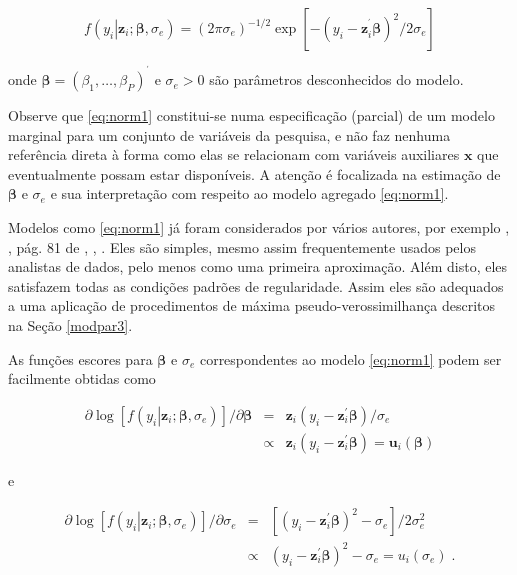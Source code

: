\documentclass[]{book}
\numberwithin{example}{chapter}
\numberwithin{remark}{chapter}
\numberwithin{definition}{chapter}
\begin{document}
\begin{equation}
f\left( \left. y_{i}\right|\mathbf{z}_{i};\mathbf{\beta },\sigma_{e}\right) =\left( 2\pi \sigma _{e}\right) ^{-1/2}\exp \left[ -\left( y_{i}-\mathbf{z}_{i}^{^{\prime }}\mathbf{\beta }\right) ^{2}/2\sigma _{e}\right]
\label{eq:norm1}
\end{equation}

onde
\(\mathbf{\beta }=\left( \beta _{1},\ldots ,\beta _{P}\right) ^{^{\prime }}\)
e \(\sigma_{e}>0\) são parâmetros desconhecidos do modelo.

Observe que \eqref{eq:norm1} constitui-se numa especificação (parcial) de
um modelo marginal para um conjunto de variáveis da pesquisa, e não faz
nenhuma referência direta à forma como elas se relacionam com variáveis
auxiliares \(\mathbf{x}\) que eventualmente possam estar disponíveis. A
atenção é focalizada na estimação de \(\mathbf{\beta }\) e
\(\sigma_{e}\) e sua interpretação com respeito ao modelo agregado
\eqref{eq:norm1}.

Modelos como \eqref{eq:norm1} já foram considerados por vários autores,
por exemplo \citep{holt80b}, \citep{NH80}, pág. 81 de \citep{Sk89b} ,
\citep{chambers86}, \citep{chambers95}. Eles são simples, mesmo assim
frequentemente usados pelos analistas de dados, pelo menos como uma
primeira aproximação. Além disto, eles satisfazem todas as condições
padrões de regularidade. Assim eles são adequados a uma aplicação de
procedimentos de máxima pseudo-verossimilhança descritos na Seção
\ref{modpar3}.

As funções escores para \(\mathbf{\beta}\) e \(\sigma _{e}\)
correspondentes ao modelo \eqref{eq:norm1} podem ser facilmente obtidas
como

\begin{eqnarray}
\partial \log \left[ f\left( \left. y_{i}\right| \mathbf{z}_{i};\mathbf{
\beta },\sigma _{e}\right) \right] /\partial \mathbf{\beta } &=&\mathbf{z}
_{i}\left( y_{i}-\mathbf{z}_{i}^{\prime }\mathbf{\beta }\right) /\sigma _{e}
\label{eq:norm2} \\
&\propto &\mathbf{z}_{i}\left( y_{i}-\mathbf{z}_{i}^{\prime }\mathbf{
\beta }\right) =\mathbf{u}_{i}\left( \mathbf{\beta }\right)  \nonumber
\end{eqnarray}

e

\begin{eqnarray*}
\partial \log \left[ f\left( \left. y_{i}\right| \mathbf{z}_{i};\mathbf{
\beta },\sigma _{e}\right) \right] /\partial \sigma _{e} &=&\left[ \left(
y_{i}-\mathbf{z}_{i}^{\prime }\mathbf{\beta }\right) ^{2}-\sigma _{e}\right]
/2\sigma _{e}^{2}  \label{eq:norm3} \\
&\propto &\left( y_{i}-\mathbf{z}_{i}^{\prime }\mathbf{\beta }\right)
^{2}-\sigma _{e}=u_{i}\left( \sigma _{e}\right) \;.  
\end{eqnarray*}
\end{document}
